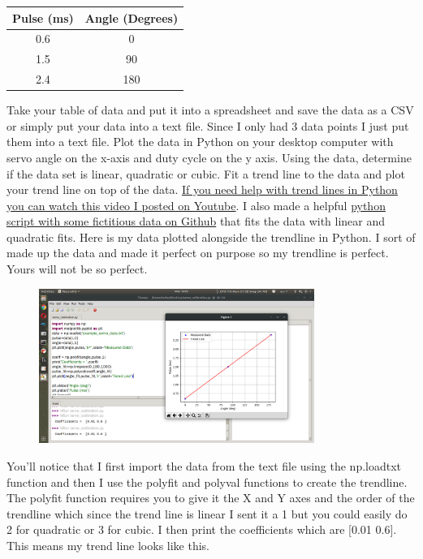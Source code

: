\begin{table}[H]
\begin{center}
\begin{tabular}{|c|c|}
\hline
Pulse (ms) & Angle (Degrees) \\
\hline
0.6 & 0 \\
\hline
1.5 & 90 \\
\hline
2.4 & 180 \\
\hline
\end{tabular}
\end{center}
\end{table}
    Take your table of data and put it into a spreadsheet and save the data as a CSV or simply put your data into a text file. Since I only had 3 data points I just put them into a text file. Plot the data in Python on your desktop computer with servo angle on the x-axis and duty cycle on the y axis. Using the data, determine if the data set is linear, quadratic or cubic. Fit a trend line to the data and plot your trend line on top of the data. \href{https://www.youtube.com/watch?v=4vYYPHRMdqM&feature=youtu.be}{If you need help with trend lines in Python you can watch this video I posted on Youtube}. I also made a helpful \href{https://github.com/cmontalvo251/Python/blob/master/instrumentation/book_problems/least_squares_regression.py}{python script with some fictitious data on Github} that fits the data with linear and quadratic fits. Here is my data plotted alongside the trendline in Python. I sort of made up the data and made it perfect on purpose so my trendline is perfect. Yours will not be so perfect.
\begin{figure}[H]
  \begin{center}
    \includegraphics[width=0.8\textwidth]{Figures/trendline.png}
  \end{center}
\end{figure}
You’ll notice that I first import the data from the text file using the np.loadtxt function and then I use the polyfit and polyval functions to create the trendline. The polyfit function requires you to give it the X and Y axes and the order of the trendline which since the trend line is linear I sent it a 1 but you could easily do 2 for quadratic or 3 for cubic. I then print the coefficients which are [0.01 0.6]. This means my trend line looks like this.
